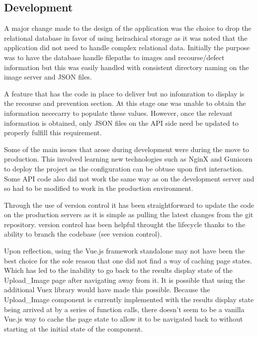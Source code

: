   \subsection{Development}
    A major change made to the design of the application was the choice to drop the relational database in favor of using heirachical storage as it was noted that the application did not need to handle complex relational data. Initially the purpose was to have the database handle filepaths to images and recourse/defect information but this was easily handled with consistent directory naming on the image server and JSON files.
    \par
    A feature that has the code in place to deliver but no infomration to display is the recourse and prevention section. At this stage one was unable to obtain the information nececarry to populate these values. However, once the relevant information is obtained, only JSON files on the API side need be updated to properly fulfill this requirement.
    \par
    Some of the main issues that arose during development were during the move to production. This involved learning new technologies such as NginX and Gunicorn to deploy the project as the configuration can be obtuse upon first interaction. Some API code also did not work the same way as on the development server and so had to be modified to work in the production environment.
    \par
    Through the use of version control it has been straightforward to update the code on the production servers as it is simple as pulling the latest changes from the git repository. version control has been helpful throught the lifecycle thanks to the ability to branch the codebase (see version control).
    \par
    Upon reflection, using the Vue.js framework standalone may not have been the best choice for the sole reason that one did not find a way of caching page states. Which has led to the inability to go back to the results display state of the Upload_Image page after navigating away from it. It is possible that using the additional Vuex library would have made this possible. Because the Upload_Image component is currently implemented with the results display state being arrived at by a series of function calls, there doesn't seem to be a vanilla Vue.js way to cache the page state to allow it to be navigated back to without starting at the initial state of the component. 

